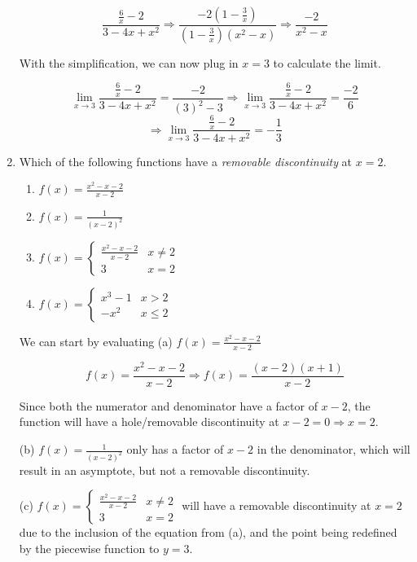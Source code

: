 \documentclass{article}
\begin{document}
\begin{enumerate}
\[\frac{\frac{6}{x} - 2}{3 - 4x + x^{2}}
    \Longrightarrow \frac{-2(1 - \frac{3}{x})}{(1 - \frac{3}{x})(x^{2} - x)}
    \Longrightarrow \frac{-2}{x^{2} - x}\]

With the simplification, we can now plug in $x = 3$ to calculate the limit.

\[\underset{x \rightarrow 3}{\lim}\frac{\frac{6}{x} - 2}{3 - 4x + x^{2}} = \frac{-2}{{(3)}^{2} - 3}
    \Longrightarrow \underset{x \rightarrow 3}{\lim}\frac{\frac{6}{x} - 2}{3 - 4x + x^{2}} = \frac{-2}{6}\]
\[\Longrightarrow \underset{x \rightarrow 3}{\lim}\frac{\frac{6}{x} - 2}{3 - 4x + x^{2}} = -\frac{1}{3}\]

\item Which of the following functions have a \textit{removable discontinuity} at $x = 2$.
    \begin{enumerate}
    \item $f(x) = \frac{x^{2} - x - 2}{x - 2}$
    \item $f(x) = \frac{1}{{(x - 2)}^{2}}$
    \item $f(x) = \begin{cases} \frac{x^{2} - x - 2}{x - 2} & x \neq 2\\ 3 & x = 2 \end{cases}$
    \item $f(x) = \begin{cases} x^{3} - 1 & x > 2\\ -x^{2} & x \leq 2 \end{cases}$
    \end{enumerate}

We can start by evaluating (a) $f(x) = \frac{x^{2} - x - 2}{x - 2}$

\[f(x) = \frac{x^{2} - x - 2}{x - 2} \Longrightarrow f(x) = \frac{(x - 2)(x + 1)}{x - 2}\]

Since both the numerator and denominator have a factor of $x - 2$, the function will have a
hole/removable discontinuity at $x - 2 = 0 \Longrightarrow x = 2$.

(b)  $f(x) = \frac{1}{{(x - 2)}^{2}}$ only has a factor of $x - 2$ in the denominator,
which will result in an asymptote, but not a removable discontinuity.

(c) $f(x) = \begin{cases} \frac{x^{2} - x - 2}{x - 2} & x \neq 2\\ 3 & x = 2 \end{cases}$ will
have a removable discontinuity at $x = 2$ due to the inclusion of the equation from (a), and
the point being redefined by the piecewise function to $y = 3$.


\end{enumerate}
\end{document}
